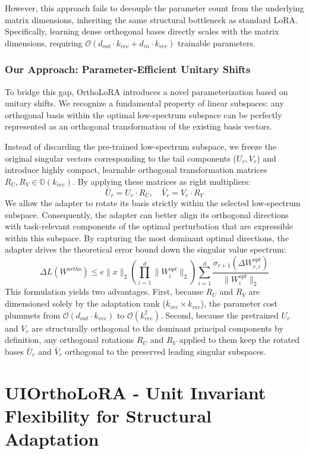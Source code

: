 \documentclass{article}
\begin{document}
However, this approach fails to decouple the parameter count from the underlying matrix dimensions, inheriting the same structural bottleneck as standard LoRA. Specifically, learning dense orthogonal bases directly scales with the matrix dimensions, requiring $\mathcal{O}(d_{out} \cdot k_{vec} + d_{in} \cdot k_{vec})$ trainable parameters.

\subsubsection{Our Approach: Parameter-Efficient Unitary Shifts}

To bridge this gap, OrthoLoRA introduces a novel parameterization based on unitary shifts. We recognize a fundamental property of linear subspaces: any orthogonal basis within the optimal low-spectrum subspace can be perfectly represented as an orthogonal transformation of the existing basis vectors.

Instead of discarding the pre-trained low-spectrum subspace, we freeze the original singular vectors corresponding to the tail components ($U_{r}, V_{r}$) and introduce highly compact, learnable orthogonal transformation matrices $R_U, R_V \in \mathbb{O}(k_{vec})$. By applying these matrices as right multipliers:
\[
\bar{U}_{r} = U_{r} \cdot R_U,
\quad
\bar{V}_{r} = V_{r} \cdot R_V
\]
We allow the adapter to rotate its basis strictly within the selected low-spectrum subspace. Consequently, the adapter can better align its orthogonal directions with task-relevant components of the optimal perturbation that are expressible within this subspace. By capturing the most dominant optimal directions, the adapter drives the theoretical error bound down the singular value spectrum:
\[
\Delta L(W^{ortho})
\leq
e \|x\|_2
\left(
\prod_{i=1}^d
\|W^{opt}_{i}\|_2
\right)
\sum_{i=1}^d
\frac{\sigma_{r+1}(\Delta W_{r,i}^{opt})}{\|W^{opt}_{i}\|_2}
\]
This formulation yields two advantages. First, because $R_U$ and $R_V$ are dimensioned solely by the adaptation rank ($k_{vec} \times k_{vec}$), the parameter cost plummets from $\mathcal{O}(d_{out} \cdot k_{vec})$ to $\mathcal{O}(k_{vec}^2)$. Second, because the pretrained \(U_r\) and \(V_r\) are structurally orthogonal
to the dominant principal components by definition, any orthogonal rotations
\(R_U\) and \(R_V\) applied to them keep the rotated bases
\(\bar{U}_r\) and \(\bar{V}_r\) orthogonal to the preserved leading singular subspaces.

\section{UIOrthoLoRA - Unit Invariant Flexibility for Structural Adaptation}
\label{sec:uiortholora}
\end{document}
